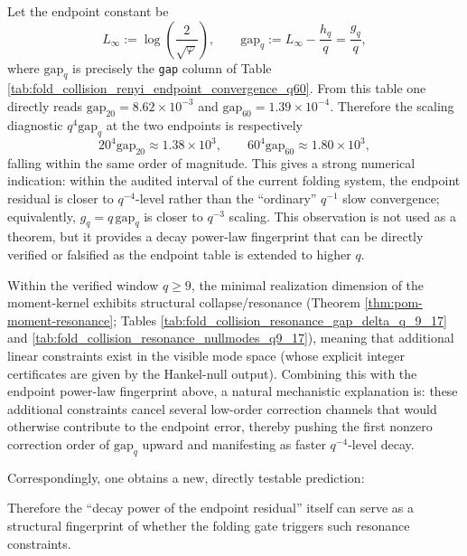 \begin{remark}\label{rem:pom-endpoint-gap-qminus4}
Let the endpoint constant be
\[
L_\infty:=\log\!\left(\frac{2}{\sqrt{\varphi}}\right),
\qquad
\mathrm{gap}_q:=L_\infty-\frac{h_q}{q}=\frac{g_q}{q},
\]
where \(\mathrm{gap}_q\) is precisely the \texttt{gap} column of Table \ref{tab:fold_collision_renyi_endpoint_convergence_q60}.
From this table one directly reads
\(
\mathrm{gap}_{20}=8.62\times 10^{-3}
\)
and
\(
\mathrm{gap}_{60}=1.39\times 10^{-4}
\).
Therefore the scaling diagnostic
\(
q^4\mathrm{gap}_q
\)
at the two endpoints is respectively
\[
20^4\mathrm{gap}_{20}\approx 1.38\times 10^3,
\qquad
60^4\mathrm{gap}_{60}\approx 1.80\times 10^3,
\]
falling within the same order of magnitude.
This gives a strong numerical indication: within the audited interval of the current folding system, the endpoint residual is closer to \(q^{-4}\)-level rather than the ``ordinary'' \(q^{-1}\) slow convergence; equivalently, \(g_q=q\,\mathrm{gap}_q\) is closer to \(q^{-3}\) scaling.
This observation is not used as a theorem, but it provides a decay power-law fingerprint that can be directly verified or falsified as the endpoint table is extended to higher \(q\).
\end{remark}

\begin{remark}\label{rem:pom-endpoint-gap-resonance-link}
Within the verified window \(q\ge 9\), the minimal realization dimension of the moment-kernel exhibits structural collapse/resonance (Theorem \ref{thm:pom-moment-resonance}; Tables \ref{tab:fold_collision_resonance_gap_delta_q_9_17} and \ref{tab:fold_collision_resonance_nullmodes_q9_17}), meaning that additional linear constraints exist in the visible mode space (whose explicit integer certificates are given by the Hankel-null output).
Combining this with the endpoint power-law fingerprint above, a natural mechanistic explanation is: these additional constraints cancel several low-order correction channels that would otherwise contribute to the endpoint error, thereby pushing the first nonzero correction order of \(\mathrm{gap}_q\) upward and manifesting as faster \(q^{-4}\)-level decay.
\par
Correspondingly, one obtains a new, directly testable prediction:
\begin{center}
\end{center}
Therefore the ``decay power of the endpoint residual'' itself can serve as a structural fingerprint of whether the folding gate triggers such resonance constraints.
\end{remark}

